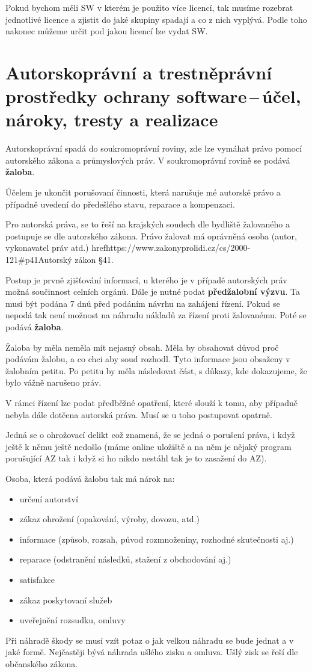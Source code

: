 Pokud bychom měli SW v kterém je použito více licencí, tak musíme rozebrat jednotlivé licence a zjistit do jaké skupiny spadají a co z nich vyplývá. Podle toho nakonec můžeme určit pod jakou licencí lze vydat SW.










\newpage
\section{Autorskoprávní a trestněprávní prostředky ochrany software\,--\,účel, nároky, tresty a realizace}

Autorskoprávní spadá do soukromoprávní roviny, zde lze vymáhat právo pomocí autorského zákona a průmyslových práv. V soukromoprávní rovině se podává \textbf{žaloba}.

Účelem je ukončit porušovaní činnosti, která narušuje mé autorské právo a případně uvedení do předešlého stavu, reparace a kompenzaci. 

Pro autorská práva, se to řeší na krajských soudech dle bydliště žalovaného a postupuje se dle autorského zákona. Právo žalovat má oprávněná osoba (autor, vykonavatel práv atd.) href{https://www.zakonyprolidi.cz/cs/2000-121#p41}{Autorský zákon §41}.

Postup je prvně zjišťování informací, u kterého je v případě autorských práv možná součinnost celních orgánů. Dále je nutné podat \textbf{předžalobní výzvu}. Ta musí být podána 7 dnů před podáním návrhu na zahájení řízení. Pokud se nepodá tak není možnost na náhradu nákladů za řízení proti žalovanému. Poté se podává \textbf{žaloba}.

Žaloba by měla neměla mít nejasný obsah. Měla by obsahovat důvod proč podávám žalobu, a co chci aby soud rozhodl. Tyto informace jsou obsaženy v žalobním petitu. Po petitu by měla následovat část, s důkazy, kde dokazujeme, že bylo vážně narušeno práv.

V rámci řízení lze podat předběžné opatření, které slouží k tomu, aby případně nebyla dále dotčena autorská práva. Musí se u toho postupovat opatrně.

Jedná se o ohrožovací delikt což znamená, že se jedná o porušení práva, i když ještě k němu ještě nedošlo (máme online uložiště a na něm je nějaký program porušující AZ tak i když si ho nikdo nestáhl tak je to zasažení do AZ). 

Osoba, která podává žalobu tak má nárok na:
\begin{itemize}
    \item určení autorství
    \item zákaz ohrožení (opakování, výroby, dovozu, atd.)
    \item informace (způsob, rozsah, původ rozmnoženiny, rozhodné skutečnosti aj.)
    \item reparace (odstranění následků, stažení z obchodování aj.)
    \item satisfakce 
    \item zákaz poskytovaní služeb
    \item uveřejnění rozsudku, omluvy
\end{itemize}

Při náhradě škody se musí vzít potaz o jak velkou náhradu se bude jednat a v jaké formě. Nejčastěji bývá náhrada ušlého zisku a omluva. Ušlý zisk se řeší dle občanského zákona.

